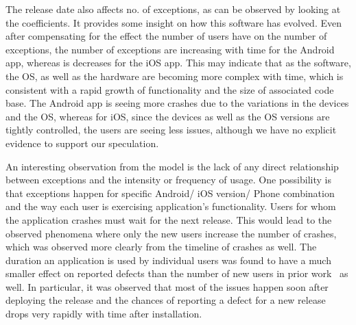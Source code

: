 \documentclass[smallcondensed]{svjour3}     %
\begin{document}
The release date also affects no. of exceptions, as can be observed by looking 
at the coefficients. It provides some insight on
how this software has evolved.  
Even after compensating for the effect the number of
users have on the number of exceptions, the number of exceptions are
increasing with time for the Android app, whereas is decreases for the iOS app. 
This may indicate that as the software, the OS, as well as the hardware are becoming 
more complex with time, which is consistent with a rapid growth of
functionality and the size of associated code base. The Android app is seeing more crashes due to the variations in the devices and the OS, whereas for iOS, since the devices as well as the OS versions are tightly controlled, the users are seeing less issues, although we have no explicit evidence to support our speculation. 

An interesting observation from the model is the lack of any direct relationship 
between exceptions and the intensity or frequency of usage.
One possibility is that exceptions happen for specific Android/
iOS version/ Phone combination and the way each user is exercising application's
functionality. Users for whom the application crashes must wait for
the next release. This would lead to the observed phenomena where
only the new users increase the number of crashes, which was observed more 
clearly from the timeline of crashes as well. The duration 
an application is used by individual users was found to have a much
smaller effect on reported defects than the number of
new users in prior work~\cite{hmps15,IQ08,MZL05} as well. In particular, it was observed
that most of the issues happen soon after deploying the release 
and the chances of reporting a defect for a new release drops 
very rapidly with time after installation.
\end{document}
